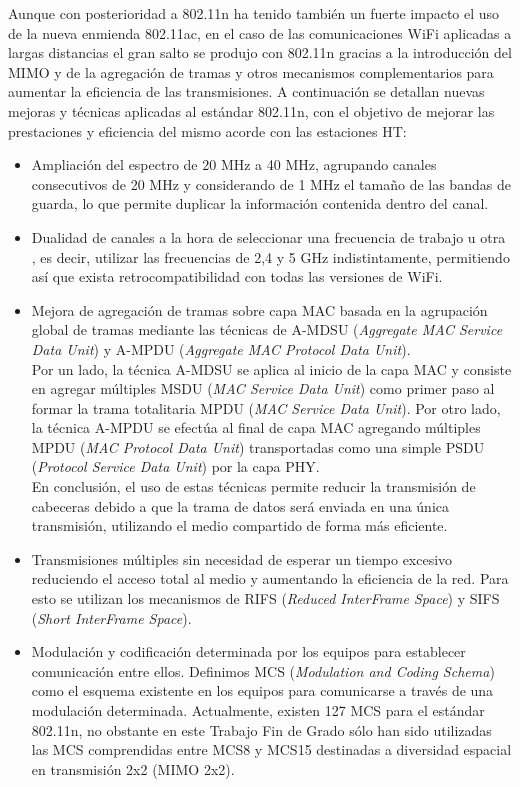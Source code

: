 Aunque con posterioridad a 802.11n ha tenido también un fuerte impacto el uso de la nueva enmienda 802.11ac, en el caso de las comunicaciones WiFi aplicadas a largas distancias el gran salto se produjo con 802.11n gracias a la introducción del MIMO y de la agregación de tramas y otros mecanismos complementarios para aumentar la eficiencia de las transmisiones. A continuación se detallan nuevas mejoras y técnicas aplicadas al estándar 802.11n, con el objetivo de mejorar las prestaciones y eficiencia del mismo acorde con las estaciones HT:
\begin{itemize}
    \item Ampliación del espectro de 20 MHz a 40 MHz, agrupando canales consecutivos de 20 MHz y considerando de 1 MHz el tamaño de las bandas de guarda, lo que permite duplicar la información contenida dentro del canal.
    
    \item Dualidad de canales a la hora de seleccionar una frecuencia de trabajo u otra , es decir, utilizar las frecuencias de 2,4 y 5 GHz indistintamente, permitiendo así que exista retrocompatibilidad con todas las versiones de WiFi.
    \item Mejora de agregación de tramas sobre capa MAC basada en la agrupación global de tramas mediante las técnicas de A-MDSU (\textit{Aggregate MAC Service Data Unit}) y A-MPDU (\textit{Aggregate MAC Protocol Data Unit}). \\
    
    Por un lado, la técnica A-MDSU se aplica al inicio de la capa MAC y consiste en agregar múltiples MSDU (\textit{MAC Service Data Unit}) como primer paso al formar la trama totalitaria MPDU (\textit{MAC Service Data Unit}). Por otro lado, la técnica A-MPDU se efectúa al final de capa MAC agregando múltiples MPDU (\textit{MAC Protocol Data Unit}) transportadas como una simple PSDU (\textit{Protocol Service Data Unit}) por la capa PHY.\\
    
    En conclusión, el uso de estas técnicas permite reducir la transmisión de cabeceras debido a que la trama de datos será enviada en una única transmisión, utilizando el medio compartido de forma más eficiente.
    
    \item Transmisiones múltiples sin necesidad de esperar un tiempo excesivo reduciendo el acceso total al medio y aumentando la eficiencia de la red. Para esto se utilizan los mecanismos de RIFS (\textit{Reduced InterFrame Space}) y SIFS (\textit{Short InterFrame Space}).
    
    \item Modulación y codificación determinada por los equipos para establecer comunicación entre ellos. Definimos MCS (\textit{Modulation and Coding Schema}) como el esquema existente en los equipos para comunicarse a través de una modulación determinada. Actualmente, existen 127 MCS para el estándar 802.11n, no obstante en este Trabajo Fin de Grado sólo han sido utilizadas las MCS comprendidas entre MCS8 y MCS15 destinadas a diversidad espacial en transmisión 2x2 (MIMO 2x2).
\end{itemize}

